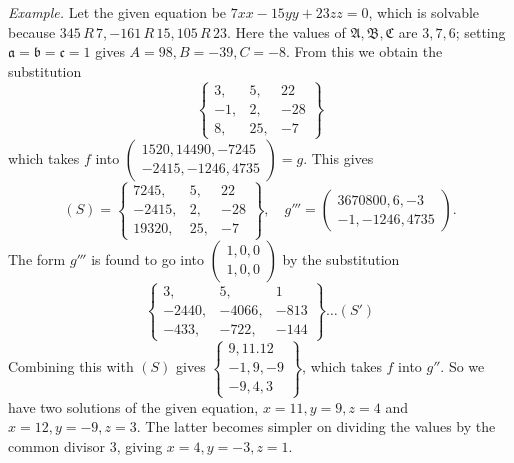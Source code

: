 \emph{Example.} Let the given equation be \(7xx-15yy+23zz=0\), which is solvable
because \(345\,R\,7,-161\,R\,15,105\,R\,23\). Here the values of \(\mathfrak A,\mathfrak B,\mathfrak C\) are \(3,7,6\);
setting \(\mathfrak a=\mathfrak b=\mathfrak c=1\) gives \(A=98,B=-39,C=-8\). From this we obtain the substitution
\[
\left\{\begin{array}{rrr}3,&5,&22\\-1,&2,&-28\\8,&25,&-7\end{array}\right\}
\]
which takes \(f\) into \(\left(\begin{smallmatrix}1520,14490,-7245\\-2415,-1246,4735\end{smallmatrix}\right)=g\). This gives
\[
(S)=\left\{\begin{array}{rrr}7245,&5,&22\\-2415,&2,&-28\\19320,&25,&-7\end{array}\right\},\quad
g'''=\left(\begin{smallmatrix}3670800,6,-3\\-1,-1246,4735\end{smallmatrix}\right).
\]
The form \(g'''\) is found to go into \(\left(\begin{smallmatrix}1,0,0\\1,0,0\end{smallmatrix}\right)\) by the substitution
\[
\left\{\begin{array}{rrr}3,&5,&1\\-2440,&-4066,&-813\\-433,&-722,&-144\end{array}\right\}\ldots(S')
\]
Combining this with \((S)\) gives \(\left\{\begin{smallmatrix}9,11.12\\-1,9,-9\\-9,4,3\end{smallmatrix}\right\}\), which takes \(f\)
into \(g''\). So we have two solutions of the given equation,
\(x=11,y=9,z=4\) and \(x=12,y=-9,z=3\). The latter becomes simpler on dividing the
values by the common divisor \(3\), giving \(x=4,y=-3,z=1\).

